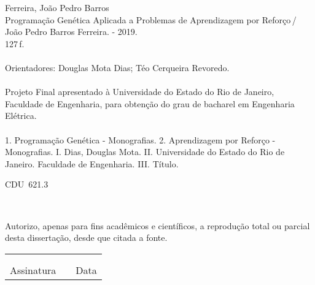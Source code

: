 \begin{titlepage}
\begin{center}
\begin{boxedminipage}{140mm}
{\begin{minipage}[top]{115mm}
		Ferreira, João Pedro Barros\\
		\phantom{XX}Programação Genética Aplicada a Problemas de
		Aprendizagem por Reforço\,/\,João Pedro Barros
		Ferreira. - 2019.\\
		\phantom{XX}127\,f.\\
		\phantom{XX}\\
		\phantom{XX}Orientadores: Douglas Mota Dias; Téo Cerqueira Revoredo.\\
\hspace*{5mm}
\\
       		\phantom{XX}Projeto Final apresentado à Universidade do Estado
       			do Rio de Janeiro, Faculdade de Engenharia, para
       			obtenção do grau de bacharel em Engenharia Elétrica.\\
		\phantom{XX}\\
		\phantom{XX} 1. Programação Genética - Monografias. 2.
		Aprendizagem por Reforço - Monografias. I. Dias,
		Douglas Mota. II. Universidade do Estado do Rio de
		Janeiro. Faculdade de Engenharia. III. Título.
	\end{minipage}}
	\vspace*{5mm}
	\begin{flushright}
	 CDU~621.3
	\end{flushright}
    \vspace{1mm}
	\end{boxedminipage}\\
	\end{center}
%
	Autorizo, apenas para fins acadêmicos e científicos, a reprodução total ou parcial desta dissertação, desde que citada a fonte.\\
	\noindent
	\begin{tabular}{ccc}
	\phantom{XXXXXXXXXXXXXXXXXXXXXXXXXXXXXX}&	 \phantom{XX}	&	\phantom{XXXXXXXXXXXXXXXX}	\\
	\phantom{XXXXXXXXXXXXXXXXXXXXXXXXXXXXXX}&	 \phantom{XX}	&	\phantom{XXXXXXXXXXXXXXXX}	\\
	\cline{1-1}\cline{3-3}
	Assinatura &		&	Data
	\end{tabular}
\end{titlepage} 